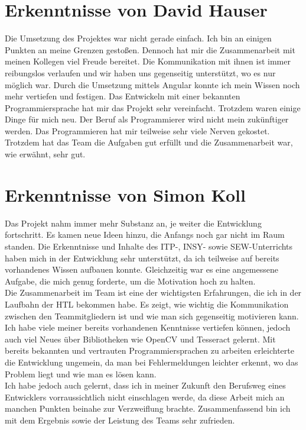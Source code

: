 \section{Erkenntnisse von David Hauser}
Die Umsetzung des Projektes war nicht gerade einfach. Ich bin an einigen Punkten an meine Grenzen gestoßen. Dennoch hat mir die Zusammenarbeit mit meinen Kollegen viel Freude bereitet. Die Kommunikation mit ihnen ist immer reibungslos verlaufen und wir haben uns gegenseitig unterstützt, wo es nur möglich war.
Durch die Umsetzung mittels Angular konnte ich mein Wissen noch mehr vertiefen und festigen. Das Entwickeln mit einer bekannten Programmiersprache hat mir das Projekt sehr vereinfacht. Trotzdem waren einige Dinge für mich neu.
Der Beruf als Programmierer wird nicht mein zukünftiger werden. Das Programmieren hat mir teilweise sehr viele Nerven gekostet. Trotzdem hat das Team die Aufgaben gut erfüllt und die Zusammenarbeit war, wie erwähnt, sehr gut.
\newpage

\section{Erkenntnisse von Simon Koll}

Das Projekt nahm immer mehr Substanz an, je weiter die Entwicklung fortschritt. Es kamen neue Ideen hinzu, die Anfangs noch gar nicht im Raum standen. Die Erkenntnisse und Inhalte des ITP-, INSY- sowie SEW-Unterrichts haben mich in der Entwicklung sehr unterstützt, da ich teilweise auf bereits vorhandenes Wissen aufbauen konnte. Gleichzeitig war es eine angemessene Aufgabe, die mich genug forderte, um die Motivation hoch zu halten. \\
Die Zusammenarbeit im Team ist eine der wichtigsten Erfahrungen, die ich in der Laufbahn der HTL bekommen habe. Es zeigt, wie wichtig die Kommunikation zwischen den Teammitgliedern ist und wie man sich gegenseitig motivieren kann.\\
Ich habe viele meiner bereits vorhandenen Kenntnisse vertiefen können, jedoch auch viel Neues über Bibliotheken wie OpenCV und Tesseract gelernt. Mit bereits bekannten und vertrauten Programmiersprachen zu arbeiten erleichterte die Entwicklung ungemein, da man bei Fehlermeldungen leichter erkennt, wo das Problem liegt und wie man es lösen kann.\\
Ich habe jedoch auch gelernt, dass ich in meiner Zukunft den Berufsweg eines Entwicklers vorraussichtlich nicht einschlagen werde, da diese Arbeit mich an manchen Punkten beinahe zur Verzweiflung brachte.
Zusammenfassend bin ich mit dem Ergebnis sowie der Leistung des Teams sehr zufrieden. 